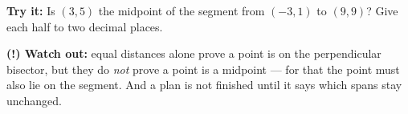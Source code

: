 \documentclass[12pt]{article}
\begin{document}
\begin{tryitbox}
\textbf{Try it:} \quad Is $(3, 5)$ the midpoint of the segment from $(-3, 1)$ to
$(9, 9)$? Give each half to two decimal places.\\[2pt]
\end{tryitbox}

\begin{watchoutbox}
\textbf{(!) Watch out:} equal distances alone prove a point is on the
perpendicular bisector, but they do \emph{not} prove a point is a midpoint ---
for that the point must also lie on the segment. And a plan is not finished
until it says which spans stay unchanged.
\end{watchoutbox}
\end{document}
